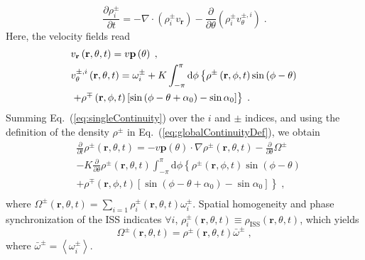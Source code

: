 \documentclass{article}
\begin{document}
\begin{equation}
    \frac{\partial \rho _{i}^{\pm}}{\partial t}=-\nabla \cdot \left( \rho _{i}^{\pm}v_{\mathbf{r}} \right) -\frac{\partial}{\partial \theta}\left( \rho _{i}^{\pm}v_{\theta}^{\pm ,i} \right) \;.
    \label{eq:singleContinuity}
\end{equation}
Here, the velocity fields read
\begin{subequations}
    \begin{align}
        &v_{\mathbf{r}}\left( \mathbf{r},\theta ,t \right) =v\mathbf{p}\left( \theta \right) \;,\\
        &v_{\theta}^{\pm ,i}\left( \mathbf{r},\theta ,t \right) =\omega _{i}^{\pm}+K\int_{-\pi}^{\pi}{\mathrm{d}\phi \left\{ \rho ^{\pm}\left( \mathbf{r},\phi ,t \right) \sin \left( \phi -\theta \right) \right.}\notag\\
        &\left. +\rho ^{\mp}\left( \mathbf{r},\phi ,t \right) \left[ \sin \left( \phi -\theta +\alpha _0 \right) -\sin \alpha _0 \right] \right\} \;.
    \end{align}
\end{subequations}
Summing Eq.~(\ref{eq:singleContinuity}) over the $i$ and $\pm$ indices, and using the definition of the density $\rho ^\pm$ in Eq.~(\ref{eq:globalContinuityDef}), we obtain  
\begin{equation}
    \label{eq:globalContinuity}
    \begin{aligned}
        &\frac{\partial}{\partial t}\rho ^{\pm}\left( \mathbf{r},\theta ,t \right) =-v\mathbf{p}\left( \theta \right) \cdot \nabla \rho ^{\pm}\left( \mathbf{r},\theta ,t \right) -\frac{\partial}{\partial \theta}\Omega^{\pm}\\
        &-K\frac{\partial}{\partial \theta}\rho ^{\pm}\left( \mathbf{r},\theta ,t \right) \int_{-\pi}^{\pi}{\mathrm{d}\phi}\left\{ \rho ^{\pm}\left( \mathbf{r},\phi ,t \right) \sin \left( \phi -\theta \right) \right.\\
        &\left. +\rho ^{\mp}\left( \mathbf{r},\phi ,t \right) \left[ \sin \left( \phi -\theta +\alpha _0 \right) -\sin \alpha _0 \right] \right\} \;,\\
    \end{aligned}
\end{equation}
where $\Omega^{\pm} \left( \mathbf{r},\theta ,t \right) =\sum_{i=1}{\rho _{i}^{\pm}\left( \mathbf{r},\theta ,t \right) \omega _{i}^{\pm}}$.
Spatial homogeneity and phase synchronization of the ISS indicates
 $\forall i$, $\rho _{i}^{\pm}\left( \mathbf{r},\theta ,t \right) \equiv \rho _{\text{ISS}}\left( \mathbf{r},\theta ,t \right)$, which yields
\begin{equation}
    \Omega ^{\pm}\left( \mathbf{r},\theta ,t \right) =\rho ^{\pm}\left( \mathbf{r},\theta ,t \right) \bar{\omega}^{\pm}\;,
\end{equation} 
where $\bar{\omega}^{\pm}=\left< \omega _{i}^{\pm} \right>$.
\end{document}
